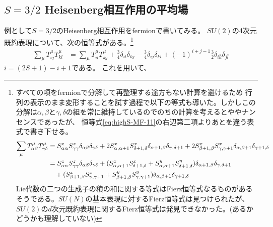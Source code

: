 \documentclass[11pt, aps, longbibliography]{article}
\begin{document}
    \subsection{$S=3/2$ Heisenberg相互作用の平均場}
        例として$S=3/2$のHeisenberg相互作用をfermionで書いてみる。
        $SU(2)$の4次元既約表現について、次の恒等式がある。\footnote{すべての項をfermionで分解して再整理する途方もない計算を避けるため
        行列の表示のまま変形することを試す過程で以下の等式も導いた。しかしこの分解は$\alpha,\beta$と$\gamma,\delta$の組を常に維持しているのでのちの計算を考えるとややナンセンスであったが、
        恒等式\eqref{eq:highS-MF-11}の右辺第二項よりあとを違う表式で書き下せる。
        \begin{align}
            \sum_{\mu}T_{\alpha\beta}^\mu T_{\gamma\delta}^\mu &= S^z_{\alpha\alpha}S^z_{\gamma\gamma}\delta_{\alpha\beta}\delta_{\gamma\delta} + 2S^x_{\alpha,\alpha+1}S^x_{\delta+1,\delta}\delta_{\alpha+1,\beta}\delta_{\gamma,\delta+1} + 2S^x_{\beta+1,\beta}S^x_{\gamma,\gamma+1}\delta_{\alpha,\beta+1}\delta_{\gamma+1,\delta} \notag \\
            &= S^z_{\alpha\alpha}S^z_{\gamma\gamma}\delta_{\alpha\beta}\delta_{\gamma\delta} + (S^x_{\alpha,\alpha+1}S^x_{\delta+1,\delta} + S^y_{\alpha,\alpha+1}S^y_{\delta+1,\delta})\delta_{\alpha+1,\beta}\delta_{\gamma,\delta+1} \notag \\
            & \quad + (S^x_{\beta+1,\beta}S^x_{\gamma,\gamma+1} + S^y_{\beta+1,\beta}S^y_{\gamma,\gamma+1})\delta_{\alpha,\beta+1}\delta_{\gamma+1,\delta} \notag 
        \end{align}
        Lie代数の二つの生成子の積の和に関する等式はFierz恒等式なるものがあるそうである。$SU(N)$の基本表現に対するFierz恒等式は見つけられたが、
        $SU(2)$の$d$次元既約表現に関するFierz恒等式は発見できなかった。(あるかどうかも理解していない)}
        \begin{align}\label{eq:highS-MF-11}
            \sum_{\mu}T_{ij}^\mu T_{kl}^\mu &= \sum_{\mu}T_{il}^\mu T_{kj}^\mu + \frac{3}{4}\delta_{il}\delta_{kj} - \frac{3}{4}\delta_{ij}\delta_{kl} + (-1)^{i+j-1}\frac{3}{2}\delta_{i\bar{k}}\delta_{j\bar{l}}
        \end{align}
        $\bar{i}=(2S+1)-i+1$である。
        これを用いて、
\end{document}
